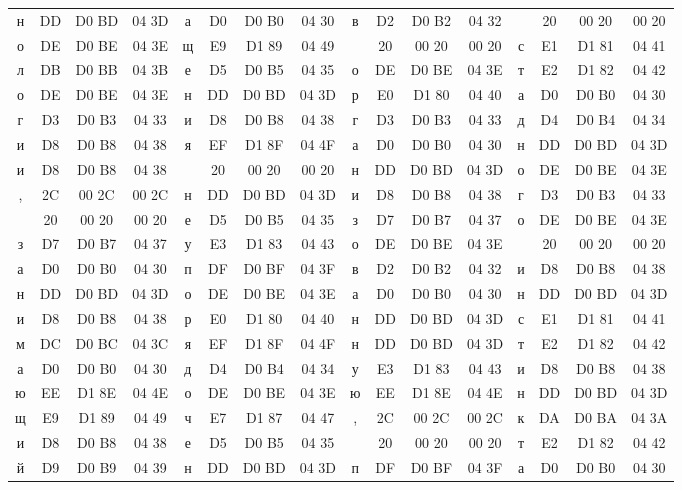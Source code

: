 {\begin{center}
\begin{tabular}{|c|c|c|c||c|c|c|c||c|c|c|c||c|c|c|c|}
			н & DD & D0 BD & 04 3D & а & D0 & D0 B0 & 04 30 & в & D2 & D0 B2 & 04 32 &   & 20 & 00 20 & 00 20\\
			о & DE & D0 BE & 04 3E & щ & E9 & D1 89 & 04 49 &   & 20 & 00 20 & 00 20 & с & E1 & D1 81 & 04 41\\
			л & DB & D0 BB & 04 3B & е & D5 & D0 B5 & 04 35 & о & DE & D0 BE & 04 3E & т & E2 & D1 82 & 04 42\\
			о & DE & D0 BE & 04 3E & н & DD & D0 BD & 04 3D & р & E0 & D1 80 & 04 40 & а & D0 & D0 B0 & 04 30\\
			г & D3 & D0 B3 & 04 33 & и & D8 & D0 B8 & 04 38 & г & D3 & D0 B3 & 04 33 & д & D4 & D0 B4 & 04 34\\
			и & D8 & D0 B8 & 04 38 & я & EF & D1 8F & 04 4F & а & D0 & D0 B0 & 04 30 & н & DD & D0 BD & 04 3D\\
			и & D8 & D0 B8 & 04 38 &   & 20 & 00 20 & 00 20 & н & DD & D0 BD & 04 3D & о & DE & D0 BE & 04 3E\\
			, & 2C & 00 2C & 00 2C & н & DD & D0 BD & 04 3D & и & D8 & D0 B8 & 04 38 & г & D3 & D0 B3 & 04 33\\
			& 20 & 00 20 & 00 20 & е & D5 & D0 B5 & 04 35 & з & D7 & D0 B7 & 04 37 & о & DE & D0 BE & 04 3E\\
			з & D7 & D0 B7 & 04 37 & у & E3 & D1 83 & 04 43 & о & DE & D0 BE & 04 3E &   & 20 & 00 20 & 00 20\\
			а & D0 & D0 B0 & 04 30 & п & DF & D0 BF & 04 3F & в & D2 & D0 B2 & 04 32 & и & D8 & D0 B8 & 04 38\\
			н & DD & D0 BD & 04 3D & о & DE & D0 BE & 04 3E & а & D0 & D0 B0 & 04 30 & н & DD & D0 BD & 04 3D\\
			и & D8 & D0 B8 & 04 38 & р & E0 & D1 80 & 04 40 & н & DD & D0 BD & 04 3D & с & E1 & D1 81 & 04 41\\
			м & DC & D0 BC & 04 3C & я & EF & D1 8F & 04 4F & н & DD & D0 BD & 04 3D & т & E2 & D1 82 & 04 42\\
			а & D0 & D0 B0 & 04 30 & д & D4 & D0 B4 & 04 34 & у & E3 & D1 83 & 04 43 & и & D8 & D0 B8 & 04 38\\
			ю & EE & D1 8E & 04 4E & о & DE & D0 BE & 04 3E & ю & EE & D1 8E & 04 4E & н & DD & D0 BD & 04 3D\\
			щ & E9 & D1 89 & 04 49 & ч & E7 & D1 87 & 04 47 & , & 2C & 00 2C & 00 2C & к & DA & D0 BA & 04 3A\\
			и & D8 & D0 B8 & 04 38 & е & D5 & D0 B5 & 04 35 &   & 20 & 00 20 & 00 20 & т & E2 & D1 82 & 04 42\\
			й & D9 & D0 B9 & 04 39 & н & DD & D0 BD & 04 3D & п & DF & D0 BF & 04 3F & а & D0 & D0 B0 & 04 30\\

\end{tabular}
\end{center}}

